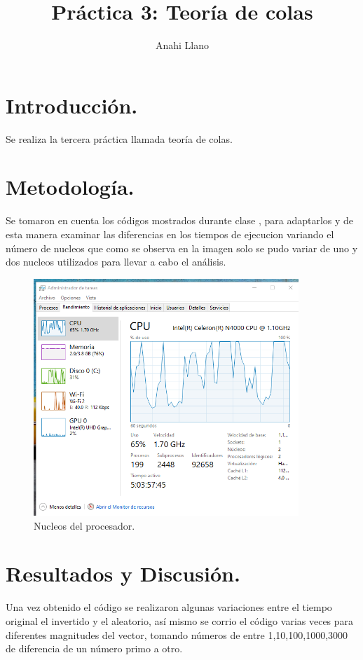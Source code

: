 \documentclass{article}
\title{Pr\'actica 3: Teor\'ia de colas}
\author{Anahi Llano}
\begin{document}
\maketitle

\section{Introducci\'{o}n.}\label{into}

Se realiza la tercera pr\'actica \cite{elisa} llamada teor\'ia de colas.
 
\section{Metodolog\'{i}a.}\label{met}

Se tomaron en cuenta los c\'odigos mostrados durante clase \citep{elisa1}, para adaptarlos y de esta manera examinar las diferencias en los tiempos de ejecucion  variando el n\'umero de nucleos que como se observa en la imagen  solo se pudo variar de uno y dos nucleos utilizados para llevar a cabo el an\'alisis.

\begin{figure}
\begin{center}
\includegraphics[width=10cm]{CPU.png}
 \caption{Nucleos del procesador.}
 \label{f1}
\end{center}
\end{figure}


\section{Resultados y Discusi\'{o}n.}\label{res}

Una vez obtenido el c\'odigo\citep{ana} se realizaron algunas variaciones entre el tiempo original el invertido y el aleatorio, as\'i mismo se corrio el c\'odigo varias veces para diferentes magnitudes del vector, tomando n\'umeros de entre 1,10,100,1000,3000 de diferencia de un n\'umero primo a otro.
\end{document}
